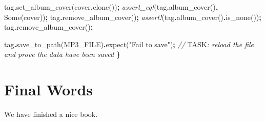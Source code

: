 \documentclass[
]{book}
\newenvironment{Shaded}{\begin{snugshade}}{\end{snugshade}}
\newcommand{\AlertTok}[1]{\textcolor[rgb]{0.94,0.16,0.16}{#1}}
\newcommand{\CommentTok}[1]{\textcolor[rgb]{0.56,0.35,0.01}{\textit{#1}}}
\newcommand{\ConstantTok}[1]{\textcolor[rgb]{0.00,0.00,0.00}{#1}}
\newcommand{\NormalTok}[1]{#1}
\newcommand{\OperatorTok}[1]{\textcolor[rgb]{0.81,0.36,0.00}{\textbf{#1}}}
\newcommand{\PreprocessorTok}[1]{\textcolor[rgb]{0.56,0.35,0.01}{\textit{#1}}}
\newcommand{\StringTok}[1]{\textcolor[rgb]{0.31,0.60,0.02}{#1}}
\begin{document}
\begin{Shaded}
\begin{Highlighting}[]
\NormalTok{    tag}\OperatorTok{.}\NormalTok{set\_album\_cover(cover}\OperatorTok{.}\NormalTok{clone())}\OperatorTok{;}
    \PreprocessorTok{assert\_eq!}\NormalTok{(tag}\OperatorTok{.}\NormalTok{album\_cover()}\OperatorTok{,} \ConstantTok{Some}\NormalTok{(cover))}\OperatorTok{;}
\NormalTok{    tag}\OperatorTok{.}\NormalTok{remove\_album\_cover()}\OperatorTok{;}
    \PreprocessorTok{assert!}\NormalTok{(tag}\OperatorTok{.}\NormalTok{album\_cover()}\OperatorTok{.}\NormalTok{is\_none())}\OperatorTok{;}
\NormalTok{    tag}\OperatorTok{.}\NormalTok{remove\_album\_cover()}\OperatorTok{;}

\NormalTok{    tag}\OperatorTok{.}\NormalTok{save\_to\_path(MP3\_FILE)}\OperatorTok{.}\NormalTok{expect(}\StringTok{"Fail to save"}\NormalTok{)}\OperatorTok{;}
    \CommentTok{// }\AlertTok{TASK}\CommentTok{: reload the file and prove the data have been saved}
\OperatorTok{\}}
\end{Highlighting}
\end{Shaded}

\hypertarget{final-words}{%
\chapter{Final Words}\label{final-words}}

We have finished a nice book.

  
\end{document}
